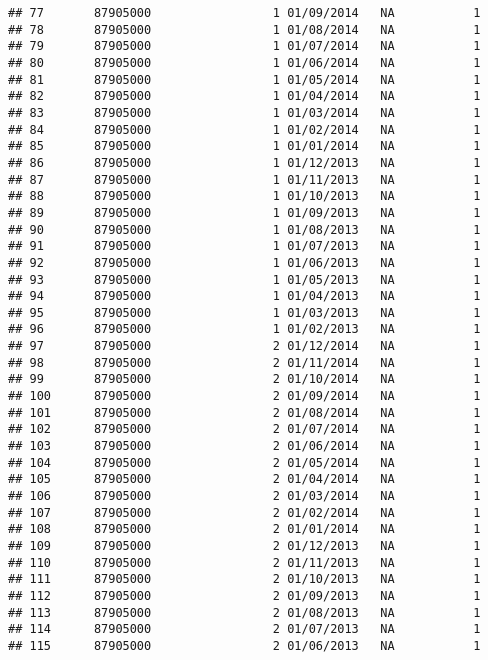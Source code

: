 \documentclass[
]{article}
\begin{document}
\begin{verbatim}
## 77       87905000                 1 01/09/2014   NA           1
## 78       87905000                 1 01/08/2014   NA           1
## 79       87905000                 1 01/07/2014   NA           1
## 80       87905000                 1 01/06/2014   NA           1
## 81       87905000                 1 01/05/2014   NA           1
## 82       87905000                 1 01/04/2014   NA           1
## 83       87905000                 1 01/03/2014   NA           1
## 84       87905000                 1 01/02/2014   NA           1
## 85       87905000                 1 01/01/2014   NA           1
## 86       87905000                 1 01/12/2013   NA           1
## 87       87905000                 1 01/11/2013   NA           1
## 88       87905000                 1 01/10/2013   NA           1
## 89       87905000                 1 01/09/2013   NA           1
## 90       87905000                 1 01/08/2013   NA           1
## 91       87905000                 1 01/07/2013   NA           1
## 92       87905000                 1 01/06/2013   NA           1
## 93       87905000                 1 01/05/2013   NA           1
## 94       87905000                 1 01/04/2013   NA           1
## 95       87905000                 1 01/03/2013   NA           1
## 96       87905000                 1 01/02/2013   NA           1
## 97       87905000                 2 01/12/2014   NA           1
## 98       87905000                 2 01/11/2014   NA           1
## 99       87905000                 2 01/10/2014   NA           1
## 100      87905000                 2 01/09/2014   NA           1
## 101      87905000                 2 01/08/2014   NA           1
## 102      87905000                 2 01/07/2014   NA           1
## 103      87905000                 2 01/06/2014   NA           1
## 104      87905000                 2 01/05/2014   NA           1
## 105      87905000                 2 01/04/2014   NA           1
## 106      87905000                 2 01/03/2014   NA           1
## 107      87905000                 2 01/02/2014   NA           1
## 108      87905000                 2 01/01/2014   NA           1
## 109      87905000                 2 01/12/2013   NA           1
## 110      87905000                 2 01/11/2013   NA           1
## 111      87905000                 2 01/10/2013   NA           1
## 112      87905000                 2 01/09/2013   NA           1
## 113      87905000                 2 01/08/2013   NA           1
## 114      87905000                 2 01/07/2013   NA           1
## 115      87905000                 2 01/06/2013   NA           1

\end{verbatim}
\end{document}

